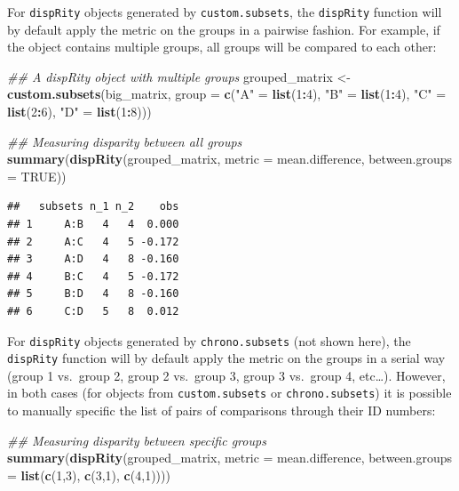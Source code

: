 \documentclass[]{book}
\newenvironment{Shaded}{\begin{snugshade}}{\end{snugshade}}
\newcommand{\CommentTok}[1]{\textcolor[rgb]{0.56,0.35,0.01}{\textit{#1}}}
\newcommand{\DataTypeTok}[1]{\textcolor[rgb]{0.13,0.29,0.53}{#1}}
\newcommand{\DecValTok}[1]{\textcolor[rgb]{0.00,0.00,0.81}{#1}}
\newcommand{\KeywordTok}[1]{\textcolor[rgb]{0.13,0.29,0.53}{\textbf{#1}}}
\newcommand{\NormalTok}[1]{#1}
\newcommand{\OperatorTok}[1]{\textcolor[rgb]{0.81,0.36,0.00}{\textbf{#1}}}
\newcommand{\OtherTok}[1]{\textcolor[rgb]{0.56,0.35,0.01}{#1}}
\newcommand{\StringTok}[1]{\textcolor[rgb]{0.31,0.60,0.02}{#1}}
\begin{document}
For \texttt{dispRity} objects generated by \texttt{custom.subsets}, the \texttt{dispRity} function will by default apply the metric on the groups in a pairwise fashion.
For example, if the object contains multiple groups, all groups will be compared to each other:

\begin{Shaded}
\begin{Highlighting}[]
\CommentTok{## A dispRity object with multiple groups}
\NormalTok{grouped_matrix <-}\StringTok{ }\KeywordTok{custom.subsets}\NormalTok{(big_matrix,}
                                 \DataTypeTok{group =} \KeywordTok{c}\NormalTok{(}\StringTok{"A"}\NormalTok{ =}\StringTok{ }\KeywordTok{list}\NormalTok{(}\DecValTok{1}\OperatorTok{:}\DecValTok{4}\NormalTok{),}
                                           \StringTok{"B"}\NormalTok{ =}\StringTok{ }\KeywordTok{list}\NormalTok{(}\DecValTok{1}\OperatorTok{:}\DecValTok{4}\NormalTok{),}
                                           \StringTok{"C"}\NormalTok{ =}\StringTok{ }\KeywordTok{list}\NormalTok{(}\DecValTok{2}\OperatorTok{:}\DecValTok{6}\NormalTok{), }
                                           \StringTok{"D"}\NormalTok{ =}\StringTok{ }\KeywordTok{list}\NormalTok{(}\DecValTok{1}\OperatorTok{:}\DecValTok{8}\NormalTok{)))}

\CommentTok{## Measuring disparity between all groups}
\KeywordTok{summary}\NormalTok{(}\KeywordTok{dispRity}\NormalTok{(grouped_matrix, }\DataTypeTok{metric =}\NormalTok{ mean.difference,}
                 \DataTypeTok{between.groups =} \OtherTok{TRUE}\NormalTok{))}
\end{Highlighting}
\end{Shaded}

\begin{verbatim}
##   subsets n_1 n_2    obs
## 1     A:B   4   4  0.000
## 2     A:C   4   5 -0.172
## 3     A:D   4   8 -0.160
## 4     B:C   4   5 -0.172
## 5     B:D   4   8 -0.160
## 6     C:D   5   8  0.012
\end{verbatim}

For \texttt{dispRity} objects generated by \texttt{chrono.subsets} (not shown here), the \texttt{dispRity} function will by default apply the metric on the groups in a serial way (group 1 vs.~group 2, group 2 vs.~group 3, group 3 vs.~group 4, etc\ldots{}).
However, in both cases (for objects from \texttt{custom.subsets} or \texttt{chrono.subsets}) it is possible to manually specific the list of pairs of comparisons through their ID numbers:

\begin{Shaded}
\begin{Highlighting}[]
\CommentTok{## Measuring disparity between specific groups}
\KeywordTok{summary}\NormalTok{(}\KeywordTok{dispRity}\NormalTok{(grouped_matrix, }\DataTypeTok{metric =}\NormalTok{ mean.difference,}
                 \DataTypeTok{between.groups =} \KeywordTok{list}\NormalTok{(}\KeywordTok{c}\NormalTok{(}\DecValTok{1}\NormalTok{,}\DecValTok{3}\NormalTok{), }\KeywordTok{c}\NormalTok{(}\DecValTok{3}\NormalTok{,}\DecValTok{1}\NormalTok{), }\KeywordTok{c}\NormalTok{(}\DecValTok{4}\NormalTok{,}\DecValTok{1}\NormalTok{))))}
\end{Highlighting}
\end{Shaded}
\end{document}
